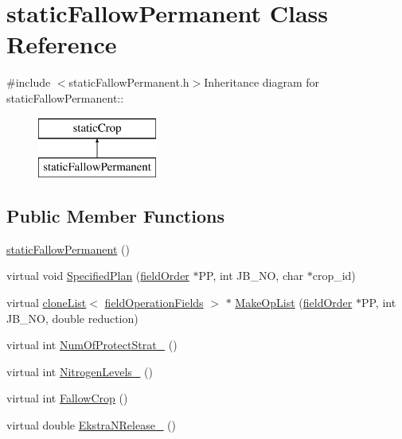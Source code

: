 \hypertarget{classstatic_fallow_permanent}{
\section{staticFallowPermanent Class Reference}
\label{classstatic_fallow_permanent}
}


{\ttfamily \#include $<$staticFallowPermanent.h$>$}Inheritance diagram for staticFallowPermanent::\begin{figure}[H]
\begin{center}
\leavevmode
\includegraphics[height=2cm]{classstatic_fallow_permanent}
\end{center}
\end{figure}
\subsection*{Public Member Functions}
\begin{DoxyCompactItemize}
\item 
\hyperlink{classstatic_fallow_permanent_a37c636b6122edf4a79407b75fb54cf9e}{staticFallowPermanent} ()
\item 
virtual void \hyperlink{classstatic_fallow_permanent_a1309e7e71b87b0264265c015250b0ea0}{SpecifiedPlan} (\hyperlink{classfield_order}{fieldOrder} $\ast$PP, int JB\_\-NO, char $\ast$crop\_\-id)
\item 
virtual \hyperlink{classclone_list}{cloneList}$<$ \hyperlink{classfield_operation_fields}{fieldOperationFields} $>$ $\ast$ \hyperlink{classstatic_fallow_permanent_a29f8a19c2c136b8b2c0d4d0cca1f0522}{MakeOpList} (\hyperlink{classfield_order}{fieldOrder} $\ast$PP, int JB\_\-NO, double reduction)
\item 
virtual int \hyperlink{classstatic_fallow_permanent_ae8cd1ab1cae0d7aef49a95ce57e4c7bc}{NumOfProtectStrat\_\-} ()
\item 
virtual int \hyperlink{classstatic_fallow_permanent_a41d25045659c5c692f9e7da40ba1cea6}{NitrogenLevels\_\-} ()
\item 
virtual int \hyperlink{classstatic_fallow_permanent_aa5f6b0e6960c0c3cf2c3c235e772d7f6}{FallowCrop} ()
\item 
virtual double \hyperlink{classstatic_fallow_permanent_abc13fb0b45757da417588021c2770357}{EkstraNRelease\_\-} ()
\end{DoxyCompactItemize}


